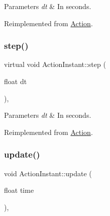 \begin{DoxyParams}{Parameters}
{\em dt} & In seconds. \\
\hline
\end{DoxyParams}


Reimplemented from \hyperlink{classAction_a9a64ee9e8e977672748f70893ebaff66}{Action}.

\mbox{\label{classActionInstant_ae1478ff1e34788247a0092dbd431c825}} 
\subsubsection{\texorpdfstring{step()}{step()}\hspace{0.1cm}{\footnotesize\ttfamily [2/2]}}
{\footnotesize\ttfamily virtual void Action\+Instant\+::step (\begin{DoxyParamCaption}\item[{float}]{dt }\end{DoxyParamCaption})\hspace{0.3cm}{\ttfamily [override]}, {\ttfamily [virtual]}}


\begin{DoxyParams}{Parameters}
{\em dt} & In seconds. \\
\hline
\end{DoxyParams}


Reimplemented from \hyperlink{classAction_a9a64ee9e8e977672748f70893ebaff66}{Action}.

\mbox{\label{classActionInstant_a59875bf08cd1f58c0c8c6693ac540ade}} 
\subsubsection{\texorpdfstring{update()}{update()}\hspace{0.1cm}{\footnotesize\ttfamily [1/2]}}
{\footnotesize\ttfamily void Action\+Instant\+::update (\begin{DoxyParamCaption}\item[{float}]{time }\end{DoxyParamCaption})\hspace{0.3cm}{\ttfamily [override]}, {\ttfamily [virtual]}}


